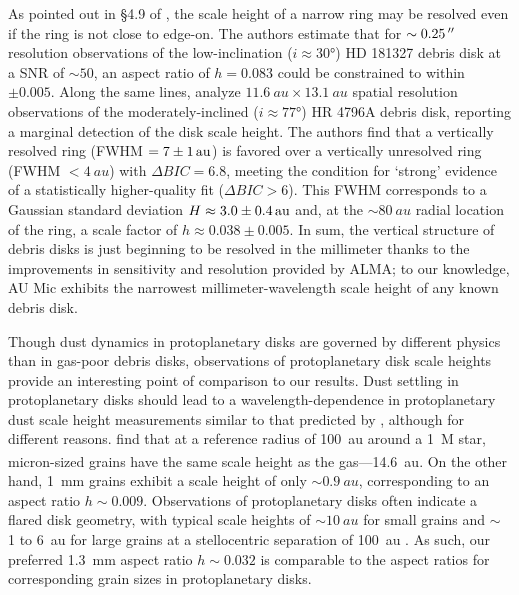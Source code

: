 \documentclass[modern]{aastex62}
\begin{document}
As pointed out in \S 4.9 of \citet{marino16}, the scale height of a narrow ring may be resolved even if the ring is not close to edge-on.
The authors estimate that for $\sim \SI{0.25}{\mbox{$^{\prime\prime}$}}$ resolution observations of the low-inclination ($i \approx \ang[angle-symbol-over-decimal]{30}$) HD 181327 debris disk at a SNR of $\sim 50$, an aspect ratio of $h=0.083$ could be constrained to within $\pm 0.005$. 
Along the same lines, \citet{kennedy18} analyze $\SI{11.6}{au} \times \SI{13.1}{au}$ spatial resolution observations of the moderately-inclined ($i \approx \ang[angle-symbol-over-decimal]{77}$) HR 4796A debris disk, reporting a marginal detection of the disk scale height.
The authors find that a vertically resolved ring (FWHM $= \SI{7 \pm 1}{au}$) is favored over a vertically unresolved ring (FWHM $< \SI{4}{au}$) with $\Delta BIC = 6.8$, meeting the condition for `strong' evidence of a statistically higher-quality fit ($\Delta BIC > 6$). 
This FWHM corresponds to a Gaussian standard deviation $H \approx \SI{3.0 \pm 0.4}{au}$ and, at the $\sim \SI{80}{au}$ radial location of the ring, a scale factor of $h \approx 0.038 \pm 0.005$.
In sum, the vertical structure of debris disks is just beginning to be resolved in the millimeter thanks to the improvements in sensitivity and resolution provided by ALMA; to our knowledge, AU Mic exhibits the narrowest millimeter-wavelength scale height of any known debris disk.


Though dust dynamics in protoplanetary disks are governed by different physics than in gas-poor debris disks, observations of protoplanetary disk scale heights provide an interesting point of comparison to our results.
Dust settling in protoplanetary disks should lead to a wavelength-dependence in protoplanetary dust scale height measurements similar to that predicted by \citet{thebault09}, although for different reasons.
\citet{boehler13} find that at a reference radius of \SI{100}{au} around a \SI{1}{M_\sun} star, micron-sized grains have the same scale height as the gas---\SI{14.6}{au}.
On the other hand, \SI{1}{mm} grains exhibit a scale height of only $\sim \SI{0.9}{au}$, corresponding to an aspect ratio $h \sim 0.009$.
Observations of protoplanetary disks often indicate a flared disk geometry, with typical scale heights of $\sim \SI{10}{au}$ for small grains and $\sim$ 1 to \SI{6}{au} for large grains at a stellocentric separation of \SI{100}{au} \citep{pinte08,pinte16,graffe13}.
As such, our preferred \SI{1.3}{mm} aspect ratio $h \sim 0.032$ is comparable to the aspect ratios for corresponding grain sizes in protoplanetary disks.
\end{document}
